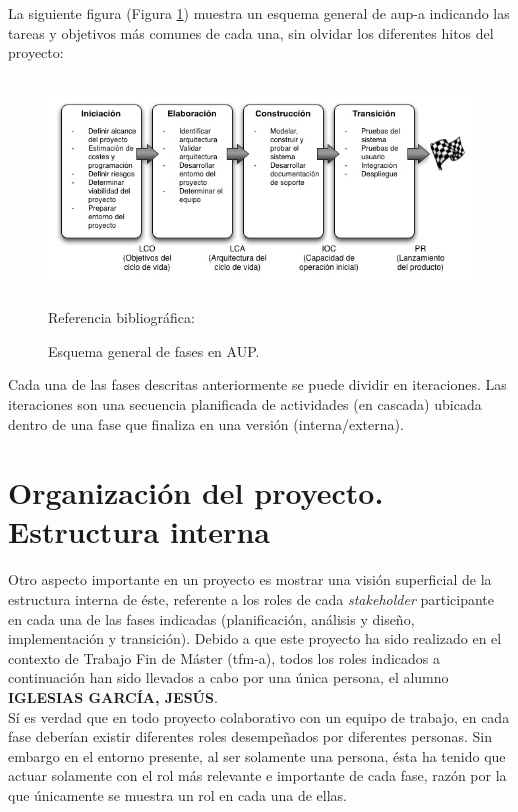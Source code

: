 \documentclass[12pt,a4paper, twoside]{report}
\newcommand{\jesus}{IGLESIAS GARCÍA, JESÚS}
\begin{document}
	La siguiente figura (Figura \ref{fig:plannig-aup-scheme}) muestra un esquema general de \gls{aup-a} indicando las tareas y objetivos más comunes de cada una, sin olvidar los diferentes hitos del proyecto:
	
	\begin{figure}[!ht]   
		\caption{Esquema general de fases en AUP.} 
		\begin{center} 
	 		\includegraphics[width=15cm,height=6cm]{Images/planning/aup} \\
			\label{fig:plannig-aup-scheme} 
			Referencia bibliográfica: \cite{torrecilla:PUA}
		\end{center}  
	\end{figure}
	
	Cada una de las fases descritas anteriormente se puede dividir en iteraciones. Las iteraciones son una secuencia planificada de actividades (en cascada) ubicada dentro de una fase que finaliza en una versión (interna/externa).		
			
	\section{Organización del proyecto. Estructura interna}

	Otro aspecto importante en un proyecto es mostrar una visión superficial de la estructura interna de éste, referente a los roles de cada \textit{\gls{stakeholder}} participante en cada una de las fases indicadas (planificación, análisis y diseño, implementación y transición). Debido a que este proyecto ha sido realizado en el contexto de Trabajo Fin de Máster (\gls{tfm-a}), todos los roles indicados a continuación han sido llevados a cabo por una única persona, el alumno \textbf{\jesus}. \\
	
	Sí es verdad que en todo proyecto colaborativo con un equipo de trabajo, en cada fase deberían existir diferentes roles desempeñados por diferentes personas. Sin embargo en el entorno presente, al ser solamente una persona, ésta ha tenido que actuar solamente con el rol más relevante e importante de cada fase, razón por la que únicamente se muestra un rol en cada una de ellas. \\
	
\end{document}
